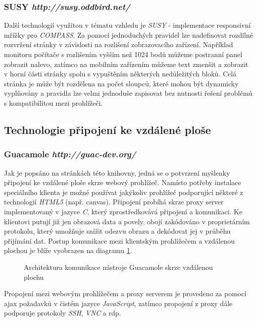 \subsubsection*{\textbf{SUSY} \hfill \emph{http://susy.oddbird.net/}}
\label{subsec:susy}
Další technologií využitou v tématu vzhledu je \emph{SUSY} - implementace responsivní mřížky pro \emph{COMPASS}. Za pomocí jednoduchých pravidel lze nadefinovat rozdílné rozvržení stránky v závislosti na rozlišení zobrazovacího zařízení. Například monitoru počítače s rozlišením vyšším než 1024 bodů můžeme postranní panel zobrazit nalevo, zatímco na mobilním zařízením můžeme text zmenšit a zobrazit v horní části stránky spolu s vypuštěním některých nedůležitých bloků. Celá stránka je může být rozdělena na počet sloupců, které mohou být dynamicky vyplňovány a pravidla lze velmi jednoduše zapisovat bez nutnosti řešení problémů s kompatibilitou mezi prohlížeči.

\subsection{Technologie připojení ke vzdálené ploše}

\subsubsection*{\textbf{Guacamole} \hfill \emph{http://guac-dev.org/}}
\label{subsec:guacamole}
Jak je popsáno na stránkách této knihovny, jedná se o potvrzení myšlenky připojení ke vzdálené ploše skrze webový prohlížeč. Namísto potřeby instalace speciálního klienta je možné používat jakýkoliv prohlížeč podporující některé z technologií \emph{HTML5} (např. canvas). Připojení probíhá skrze proxy server implementovaný v jazyce \emph{C}, který zprostředkovává připojení a komunikaci. Ke klientovi putují již jen obrazová data a povely, obojí zakódováno v proprietárním protokolu, který umožňuje snížit odezvu obrazu a dekódovat jej v průběhu přijímání dat. Postup komunikace mezi klientským prohlížečem a vzdálenou plochou je blíže vyobrazen na diagramu \ref{fig:arch_core}.

\begin{figure}[htp] 
  \caption{Architektura komunikace nástroje Guacamole skrze vzdálenou plochu}
  \label{fig:arch_core}
\end{figure}  

Propojení mezi webovým prohlížečem a proxy serverem je provedeno za pomocí \gls{ajax} požadavků v čistém jazyce \emph{JavaScript}, zatímco propojení z proxy dále podporuje protokoly \emph{SSH}, \emph{VNC} a \gls{rdp}.

